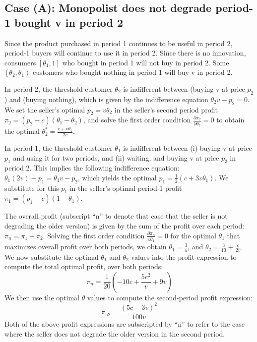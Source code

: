 \documentclass[isre,blindrev]{informs3} %
\begin{document}
\subsection{Case (A): Monopolist does not degrade period-1 bought v in period 2}\label{no-innovate-no-degrade}

Since the product purchased in period 1 continues to be useful in period 2, period-1 buyers will continue to use it in period 2. Since there is no
innovation, consumers \(\left[\theta _1,1\right]\) who bought in period 1 will not buy in period 2. Some \(\left.\left[\theta _2,\theta _1\right.\right)\)
customers who bought nothing in period 1 will buy v in period 2.

In period 2, the threshold customer \(\theta _2\) is indifferent between (buying v at price \(p_2\)) and (buying nothing), which is given by the
indifference equation \(\theta _2v-p_2=0\). We set the seller{'}s optimal \(p_2=v \theta _2\) in the seller{'}s second period profit \(\pi _2=\left(p_2-c\right)\left(\theta
_1-\theta _2\right)\), and solve the first order condition \(\frac{\partial \pi _2}{\partial \theta _2}=0\) to obtain the optimal \(\theta _2^*=\frac{c+v
\theta _1}{2 v}\).

In period 1, the threshold customer \(\theta _1\) is indifferent between (i) buying v at price \(p_1\) and using it for two periods, and (ii) waiting,
and buying v at price \(p_2\) in period 2. This implies the following indifference equation: \(\theta _1 (2 v) - p_1 = \theta _1 v - p_2\), which
yields the optimal \(p_1=\frac{1}{2} \left(c+3 v \theta _1\right)\). We substitute for this \(p_1\) in the seller{'}s optimal period-1 profit \(\pi
_1=\left(p_1-c\right)\left(1-\theta _1\right)\). 

The overall profit (subscript {``}n{''} to denote that case that the seller is not degrading the older version) is given by the sum of the profit
over each period: \(\pi _n=\pi _1+\pi _2\). Solving the first order condition \(\frac{\partial \pi _n}{\partial \theta _1}=0\) for the optimal \(\theta
_1\) that maximizes overall profit over both periods, we obtain \(\theta _1=\frac{3}{5}\), and \(\theta _2=\frac{3}{10}+\frac{c}{2 v}\). We now substitute
the optimal \(\theta _1\) and \(\theta _2\) values into the profit expression to compute the total optimal profit, over both periods:
\begin{equation}\label{pi_n_no_innov_no_degrade}
\pi _n=\frac{1}{20} \left(-10 c+\frac{5 c^2}{v}+9 v\right)
\end{equation}
We then use the optimal $\theta $ values to compute the second-period profit expression:
\begin{equation}\label{pi_n2_no_innov_no_degrade}
\pi _{\text{n2}}=\frac{(5 c-3 v)^2}{100 v}
\end{equation}
Both of the above profit expressions are subscripted by {``}n{''} to refer to the case where the seller does not degrade the older version in the
second period.
\end{document}
